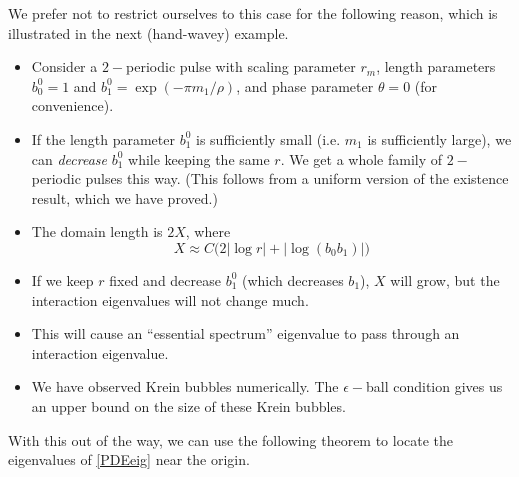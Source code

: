 \documentclass[thesis.tex]{subfiles}
\begin{document}
We prefer not to restrict ourselves to this case for the following reason, which is illustrated in the next (hand-wavey) example.
\begin{itemize}
	\item Consider a $2-$periodic pulse with scaling parameter $r_m$, length parameters $b_0^0 = 1$ and $b_1^0 = \exp(-\pi m_1/\rho)$, and phase parameter $\theta = 0$ (for convenience). 
	\item If the length parameter $b_1^0$ is sufficiently small (i.e. $m_1$ is sufficiently large), we can \emph{decrease} $b_1^0$ while keeping the same $r$. We get a whole family of $2-$periodic pulses this way. (This follows from a uniform version of the existence result, which we have proved.)
	\item The domain length is $2X$, where
	\[
	X \approx C \Big( 2 |\log r| + |\log(b_0 b_1)| \Big)
	\]
	\item If we keep $r$ fixed and decrease $b_1^0$ (which decreases $b_1$), $X$ will grow, but the interaction eigenvalues will not change much.
	\item This will cause an ``essential spectrum'' eigenvalue to pass through an interaction eigenvalue. 
	\item We have observed Krein bubbles numerically. The $\epsilon-$ball condition gives us an upper bound on the size of these Krein bubbles.
\end{itemize}

With this out of the way, we can use the following theorem to locate the eigenvalues of \eqref{PDEeig} near the origin.

\end{document}
